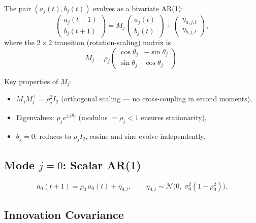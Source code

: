 \documentclass[12pt]{article}
\begin{document}
The pair $(a_j(t), b_j(t))$ evolves as a bivariate AR(1):
\begin{equation}
  \begin{pmatrix} a_j(t+1) \\ b_j(t+1) \end{pmatrix}
  = M_j \begin{pmatrix} a_j(t) \\ b_j(t) \end{pmatrix}
  + \begin{pmatrix} \eta_{a,j,t} \\ \eta_{b,j,t} \end{pmatrix},
  \label{eq:ar1-block}
\end{equation}
where the $2\times 2$ transition (rotation-scaling) matrix is
\begin{equation}
  M_j = \rho_j \begin{pmatrix} \cos\theta_j & -\sin\theta_j \\ \sin\theta_j & \cos\theta_j \end{pmatrix}.
  \label{eq:Mj}
\end{equation}

Key properties of $M_j$:
\begin{itemize}[noitemsep]
  \item $M_j M_j^\top = \rho_j^2 I_2$ (orthogonal scaling --- no cross-coupling in second moments),
  \item Eigenvalues: $\rho_j e^{\pm i\theta_j}$ (modulus $= \rho_j < 1$ ensures stationarity),
  \item $\theta_j = 0$: reduces to $\rho_j I_2$, cosine and sine evolve independently.
\end{itemize}

\subsection{Mode \texorpdfstring{$j = 0$}{j = 0}: Scalar AR(1)}

\begin{equation}
  a_0(t+1) = \rho_0\, a_0(t) + \eta_{0,t},
  \qquad \eta_{0,t} \sim \mathcal{N}\!\bigl(0,\; \sigma_0^2(1-\rho_0^2)\bigr).
  \label{eq:ar1-j0}
\end{equation}

\subsection{Innovation Covariance}
\end{document}
